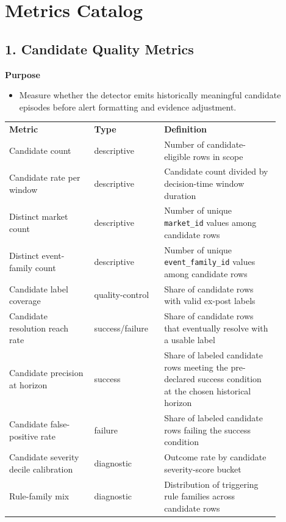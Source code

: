 \documentclass{article}
\begin{document}
\section*{Metrics Catalog}

\subsection*{1. Candidate Quality Metrics}

\textbf{Purpose}
\begin{itemize}
\item Measure whether the detector emits historically meaningful candidate episodes before alert formatting and evidence adjustment.
\end{itemize}

\begin{longtable}{p{0.28\linewidth}p{0.22\linewidth}p{0.38\linewidth}}
\textbf{Metric} & \textbf{Type} & \textbf{Definition} \\
Candidate count & descriptive & Number of candidate-eligible rows in scope \\
Candidate rate per window & descriptive & Candidate count divided by decision-time window duration \\
Distinct market count & descriptive & Number of unique \texttt{market\_id} values among candidate rows \\
Distinct event-family count & descriptive & Number of unique \texttt{event\_family\_id} values among candidate rows \\
Candidate label coverage & quality-control & Share of candidate rows with valid ex-post labels \\
Candidate resolution reach rate & success/failure & Share of candidate rows that eventually resolve with a usable label \\
Candidate precision at horizon & success & Share of labeled candidate rows meeting the pre-declared success condition at the chosen historical horizon \\
Candidate false-positive rate & failure & Share of labeled candidate rows failing the success condition \\
Candidate severity decile calibration & diagnostic & Outcome rate by candidate severity-score bucket \\
Rule-family mix & diagnostic & Distribution of triggering rule families across candidate rows \\
\end{longtable}
\end{document}
